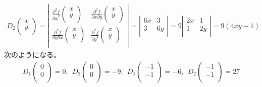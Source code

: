 \documentclass[dvipdfmx]{jsarticle}
\begin{document}
\begin{align*}
D_{2}\begin{pmatrix}
x \\
y \\
\end{pmatrix} = \left| \begin{matrix}
\frac{\partial^{2}f}{{\partial x}^{2}}\begin{pmatrix}
x \\
y \\
\end{pmatrix} & \frac{\partial^{2}f}{\partial x\partial y}\begin{pmatrix}
x \\
y \\
\end{pmatrix} \\
\frac{\partial^{2}f}{\partial y\partial x}\begin{pmatrix}
x \\
y \\
\end{pmatrix} & \frac{\partial^{2}f}{{\partial y}^{2}}\begin{pmatrix}
x \\
y \\
\end{pmatrix} \\
\end{matrix} \right| = \left| \begin{matrix}
6x & 3 \\
3 & 6y \\
\end{matrix} \right| = 9\left| \begin{matrix}
2x & 1 \\
1 & 2y \\
\end{matrix} \right| = 9(4xy - 1)
\end{align*}
次のようになる。
\begin{align*}
D_{1}\begin{pmatrix}
0 \\
0 \\
\end{pmatrix} = 0,\ \ D_{2}\begin{pmatrix}
0 \\
0 \\
\end{pmatrix} = - 9,\ \ D_{1}\begin{pmatrix}
 - 1 \\
 - 1 \\
\end{pmatrix} = - 6,\ \ D_{2}\begin{pmatrix}
 - 1 \\
 - 1 \\
\end{pmatrix} = 27
\end{align*}
\end{document}
